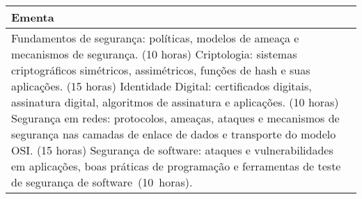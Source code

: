 \begin{quadro}[h!]
\begin{tabular}{|p{3cm} p{2cm} p{3cm} p{2cm} p{3cm} p{2cm}|}
\multicolumn{6}{|p{15cm}|}{\cellcolor{blue1} Ementa} \\\hline
\hline\multicolumn{6}{|p{15cm}|}{\scriptsize Fundamentos de segurança: políticas, modelos de ameaça e mecanismos de segurança. (10 horas) Criptologia: sistemas criptográficos simétricos, assimétricos, funções de hash e suas aplicações. (15 horas) Identidade Digital: certificados digitais, assinatura digital, algoritmos de assinatura e aplicações. (10 horas) Segurança em redes: protocolos, ameaças, ataques e mecanismos de segurança nas camadas de enlace de dados e transporte do modelo OSI. (15 horas) Segurança de software: ataques e vulnerabilidades em aplicações, boas práticas de programação e ferramentas de teste de segurança de software (10 horas).}\\\hline
\hline
	\end{tabular}
\end{quadro}
